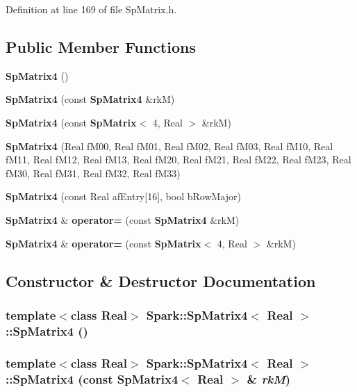 Definition at line 169 of file Sp\-Matrix.h.\subsection*{Public Member Functions}
\begin{CompactItemize}
\item 
{\bf Sp\-Matrix4} ()
\item 
{\bf Sp\-Matrix4} (const {\bf Sp\-Matrix4} \&rk\-M)
\item 
{\bf Sp\-Matrix4} (const {\bf Sp\-Matrix}$<$ 4, Real $>$ \&rk\-M)
\item 
{\bf Sp\-Matrix4} (Real f\-M00, Real f\-M01, Real f\-M02, Real f\-M03, Real f\-M10, Real f\-M11, Real f\-M12, Real f\-M13, Real f\-M20, Real f\-M21, Real f\-M22, Real f\-M23, Real f\-M30, Real f\-M31, Real f\-M32, Real f\-M33)
\item 
{\bf Sp\-Matrix4} (const Real af\-Entry[16], bool b\-Row\-Major)
\item 
{\bf Sp\-Matrix4} \& {\bf operator=} (const {\bf Sp\-Matrix4} \&rk\-M)
\item 
{\bf Sp\-Matrix4} \& {\bf operator=} (const {\bf Sp\-Matrix}$<$ 4, Real $>$ \&rk\-M)
\end{CompactItemize}


\subsection{Constructor \& Destructor Documentation}
\subsubsection{\setlength{\rightskip}{0pt plus 5cm}template$<$class Real$>$ {\bf Spark::Sp\-Matrix4}$<$ Real $>$::{\bf Sp\-Matrix4} ()}\label{classSpark_1_1SpMatrix4_a0}


\subsubsection{\setlength{\rightskip}{0pt plus 5cm}template$<$class Real$>$ {\bf Spark::Sp\-Matrix4}$<$ Real $>$::{\bf Sp\-Matrix4} (const {\bf Sp\-Matrix4}$<$ Real $>$ \& {\em rk\-M})}\label{classSpark_1_1SpMatrix4_a1}


